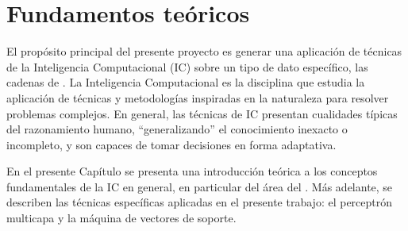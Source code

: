 %
%
%
%
\chapter{Fundamentos teóricos}
%
El propósito principal del presente proyecto es generar una aplicación
de técnicas de la Inteligencia Computacional (IC) sobre un tipo de dato
específico, las cadenas de .
La Inteligencia Computacional es la disciplina que estudia la
aplicación de técnicas y metodologías inspiradas en la naturaleza para
resolver problemas complejos.
En general, las técnicas de IC presentan cualidades típicas del
razonamiento humano, ``generalizando'' el conocimiento inexacto o 
incompleto, y son capaces de tomar decisiones en forma adaptativa.

En el presente Capítulo se presenta una introducción teórica a los
conceptos fundamentales de la IC en general, en particular del área del
.
Más adelante, se describen las técnicas específicas aplicadas en el
presente trabajo: el perceptrón multicapa y la máquina de vectores de
soporte.
